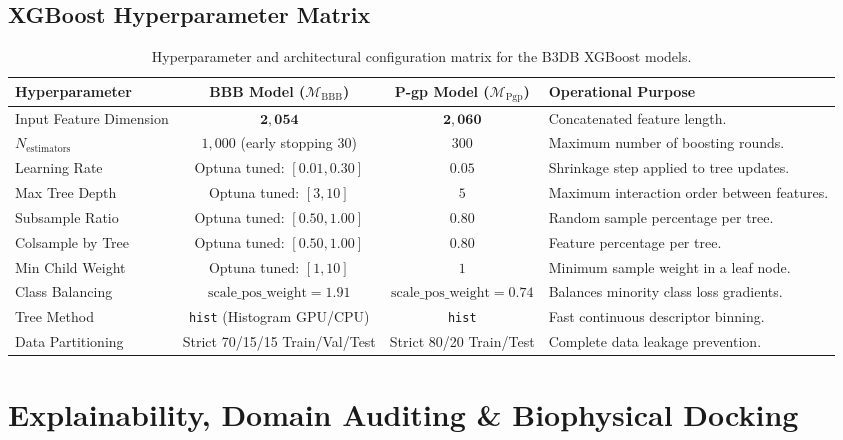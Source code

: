 \documentclass[11pt,a4paper]{article}
\begin{document}
\subsection{XGBoost Hyperparameter Matrix}
\begin{table}[h!]
\centering
\small
\begin{tabularx}{\textwidth}{l c c X}
\toprule
\textbf{Hyperparameter} & \textbf{BBB Model ($\mathcal{M}_{\text{BBB}}$)} & \textbf{P-gp Model ($\mathcal{M}_{\text{Pgp}}$)} & \textbf{Operational Purpose} \\
\midrule
Input Feature Dimension & $\mathbf{2,054}$ & $\mathbf{2,060}$ & Concatenated feature length. \\
$N_{\text{estimators}}$ & $1,000$ (early stopping $30$) & $300$ & Maximum number of boosting rounds. \\
Learning Rate & Optuna tuned: $[0.01, 0.30]$ & $0.05$ & Shrinkage step applied to tree updates. \\
Max Tree Depth & Optuna tuned: $[3, 10]$ & $5$ & Maximum interaction order between features. \\
Subsample Ratio & Optuna tuned: $[0.50, 1.00]$ & $0.80$ & Random sample percentage per tree. \\
Colsample by Tree & Optuna tuned: $[0.50, 1.00]$ & $0.80$ & Feature percentage per tree. \\
Min Child Weight & Optuna tuned: $[1, 10]$ & $1$ & Minimum sample weight in a leaf node. \\
Class Balancing & $\text{scale\_pos\_weight} = 1.91$ & $\text{scale\_pos\_weight} = 0.74$ & Balances minority class loss gradients. \\
Tree Method & \texttt{hist} (Histogram GPU/CPU) & \texttt{hist} & Fast continuous descriptor binning. \\
Data Partitioning & Strict 70/15/15 Train/Val/Test & Strict 80/20 Train/Test & Complete data leakage prevention. \\
\bottomrule
\end{tabularx}
\caption{Hyperparameter and architectural configuration matrix for the B3DB XGBoost models.}
\end{table}

\newpage
\section{Explainability, Domain Auditing \& Biophysical Docking}
\end{document}
